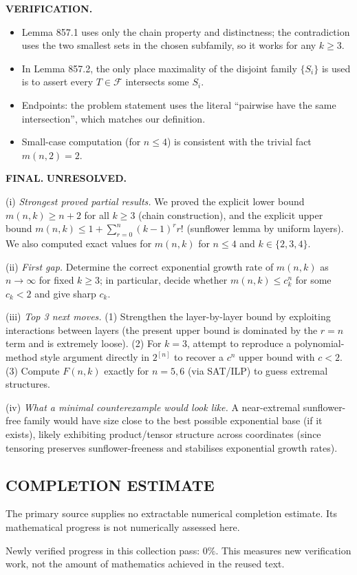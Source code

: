 \medskip
\noindent\textbf{VERIFICATION.}

\begin{itemize}
\item Lemma 857.1 uses only the chain property and distinctness; the contradiction uses the two smallest sets in the chosen subfamily, so it works for any $k\ge 3$.
\item In Lemma 857.2, the only place maximality of the disjoint family $\{S_i\}$ is used is to assert every $T\in\mathcal F$ intersects some $S_i$.
\item Endpoints: the problem statement uses the literal ``pairwise have the same intersection'', which matches our definition.
\item Small-case computation (for $n\le 4$) is consistent with the trivial fact $m(n,2)=2$.
\end{itemize}

\medskip
\noindent\textbf{FINAL.} \textbf{UNRESOLVED.}

(i) \emph{Strongest proved partial results.}
We proved the explicit lower bound $m(n,k)\ge n+2$ for all $k\ge 3$ (chain construction), and the explicit upper bound
$m(n,k)\le 1+\sum_{r=0}^n (k-1)^r r!$ (sunflower lemma by uniform layers).
We also computed exact values for $m(n,k)$ for $n\le 4$ and $k\in\{2,3,4\}$.

(ii) \emph{First gap.}
Determine the correct exponential growth rate of $m(n,k)$ as $n\to\infty$ for fixed $k\ge 3$; in particular, decide whether $m(n,k)\le c_k^n$ for some $c_k<2$ and give sharp $c_k$.

(iii) \emph{Top 3 next moves.}
(1) Strengthen the layer-by-layer bound by exploiting interactions between layers (the present upper bound is dominated by the $r=n$ term and is extremely loose).
(2) For $k=3$, attempt to reproduce a polynomial-method style argument directly in $2^{[n]}$ to recover a $c^n$ upper bound with $c<2$.
(3) Compute $F(n,k)$ exactly for $n=5,6$ (via SAT/ILP) to guess extremal structures.

(iv) \emph{What a minimal counterexample would look like.}
A near-extremal sunflower-free family would have size close to the best possible exponential base (if it exists), likely exhibiting product/tensor structure across coordinates (since tensoring preserves sunflower-freeness and stabilises exponential growth rates).




\subsection*{COMPLETION ESTIMATE}
The primary source supplies no extractable numerical completion estimate. Its mathematical progress is not numerically assessed here.

Newly verified progress in this collection pass: $0\%$. This measures new verification work, not the amount of mathematics achieved in the reused text.
